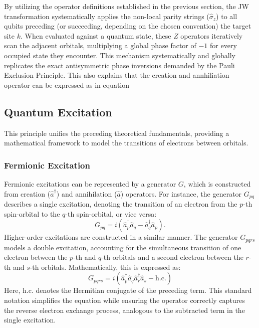 By utilizing the operator definitions established in the previous section, the JW transformation systematically applies the non-local parity strings ($\hat{\sigma}_z$) to all qubits preceding (or succeeding, depending on the chosen convention) the target site $k$. When evaluated against a quantum state, these $Z$ operators iteratively scan the adjacent orbitals, multiplying a global phase factor of $-1$ for every occupied state they encounter. This mechanism systematically and globally replicates the exact antisymmetric phase inversions demanded by the Pauli Exclusion Principle. This also explains that the creation and annhiliation operator can be expressed as in equation


\cite[chapter 7.1, 7.2]{sakurai2020modern}
\cite[chapter 1.1, 5.3]{Kottmann2025}
\cite[chapter 2.1]{schleich2025quantum}
\cite[chapter II.E]{kottmann2020feasible}
\cite[chapter III.B]{anand2022quantum}

\subsection{Quantum Excitation}
This principle unifies the preceding theoretical fundamentals, providing a mathematical framework to model the transitions of electrons between orbitals.

\subsubsection{Fermionic Excitation}
Fermionic excitations can be represented by a generator $G$, which is constructed from creation ($\hat{a}^\dagger$) and annihilation ($\hat{a}$) operators. For instance, the generator $G_{pq}$ describes a single excitation, denoting the transition of an electron from the $p$-th spin-orbital to the $q$-th spin-orbital, or vice versa:
\begin{equation}
    G_{pq} = i(\hat{a}^\dagger_p \hat{a}_q - \hat{a}^\dagger_q \hat{a}_p).
\end{equation}
Higher-order excitations are constructed in a similar manner. The generator $G_{pqrs}$ models a double excitation, accounting for the simultaneous transition of one electron between the $p$-th and $q$-th orbitals and a second electron between the $r$-th and $s$-th orbitals. Mathematically, this is expressed as:
\begin{equation}
    G_{pqrs} = i(\hat{a}^\dagger_p \hat{a}_q \hat{a}^\dagger_r \hat{a}_s - \text{h.c.})
\end{equation}
Here, $\text{h.c.}$ denotes the Hermitian conjugate of the preceding term. This standard notation simplifies the equation while ensuring the operator correctly captures the reverse electron exchange process, analogous to the subtracted term in the single excitation.

